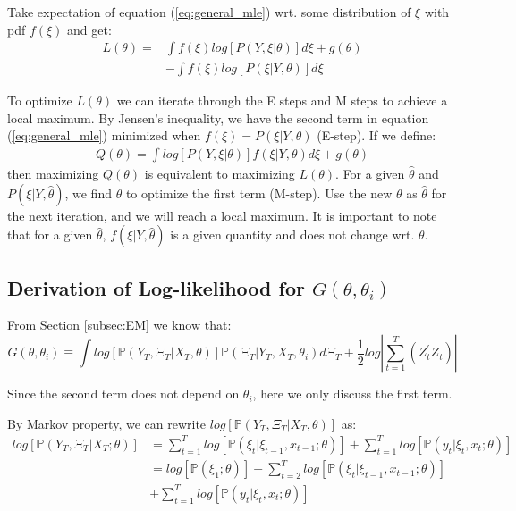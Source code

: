 \documentclass[10pt, titlepage]{article}
\numberwithin{equation}{section}
\begin{document}
Take expectation of equation (\ref{eq:general_mle}) wrt. some distribution of $\xi$ with pdf $f(\xi)$ and get:
\begin{align}
    L(\theta) = & \int f(\xi)log[P(Y,\xi|\theta)]d\xi + g(\theta) \nonumber \\
    & - \int f(\xi)log[P(\xi|Y,\theta)]d\xi \nonumber
\end{align}

To optimize $L(\theta)$ we can iterate through the E steps and M steps to achieve a local maximum. By Jensen's inequality, we have the second term in equation (\ref{eq:general_mle}) minimized when $f(\xi)=P(\xi|Y,\theta)$ (E-step). If we define:
\begin{align}
    Q(\theta) = \int log[P(Y,\xi|\theta)]f(\xi|Y,\theta)d\xi + g(\theta) \label{eq:Q}
\end{align}
then maximizing $Q(\theta)$ is equivalent to maximizing $ L(\theta)$. For a given $\hat{\theta}$ and $P(\xi|Y, \hat{\theta})$, we find $\theta$ to optimize the first term (M-step). Use the new $\theta$ as $\hat{\theta}$ for the next iteration, and we will reach a local maximum. It is important to note that for a given $\hat{\theta}$, $f(\xi|Y, \hat{\theta})$ is a given quantity and does not change wrt. $\theta$. 

\subsection{Derivation of Log-likelihood for \texorpdfstring{$G(\theta,\theta_i)$}{}} \label{ap:log}
From Section \ref{subsec:EM} we know that:
\[
    G(\theta,\theta_i) \equiv \int log[\mathbb{P}(Y_T,\Xi_T|X_T,\theta)]\mathbb{P}(\Xi_T|Y_T,X_T,\theta_i)d\Xi_T + \frac{1}{2}log\left|\sum_{t=1}^{T}(Z_t^{'}Z_t)\right| 
\]

Since the second term does not depend on $\theta_i$, here we only discuss the first term. 

By Markov property, we can rewrite $log[\mathbb{P}(Y_T,\Xi_T|X_T,\theta)]$ as:
\begin{align}
    log[\mathbb{P}(Y_T,\Xi_T|X_T;\theta)] &= \sum_{t=1}^{T}log[\mathbb{P}(\xi_t|\xi_{t-1},x_{t-1};\theta)] 
    + \sum_{t=1}^{T}log[\mathbb{P}(y_t|\xi_t,x_t;\theta)] \nonumber \\
    &= log[\mathbb{P}(\xi_1;\theta)] + \sum_{t=2}^{T}log[\mathbb{P}(\xi_t|\xi_{t-1},x_{t-1};\theta)] \nonumber \\ 
    &+ \sum_{t=1}^{T}log[\mathbb{P}(y_t|\xi_t,x_t;\theta)]\label{eq:log}
\end{align}
\end{document}
